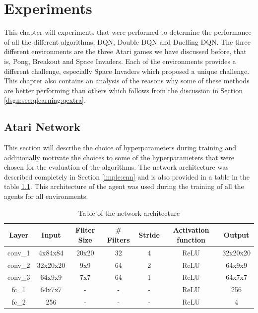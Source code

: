 \chapter{Experiments}
This chapter will experiments that were performed to determine the performance of all the different algorithms, DQN, Double DQN and Duelling DQN. The three different environments are the three Atari games we have discussed before, that is, Pong, Breakout and Space Invaders. Each of the environments provides a different challenge, especially Space Invaders which proposed a unique challenge. This chapter also contains an analysis of the reasons why some of these methods are better performing than others which follows from the discussion in Section \ref{dsgn:sec:qlearning:qextra}.

\section{Atari Network}
This section will describe the choice of hyperparameters during training and additionally motivate the choices to some of the hyperparameters that were chosen for the evaluation of the algorithms. The network architecture was described completely in Section \ref{imple:cnn} and is also provided in a table in the table \ref{table:network-arch}. This architecture of the agent was used during the training of all the agents for all environments.

\begin{table}[htbp]
  \centering
  \begin{tabular}{|c|c|c|c|c|c|c|}
    \hline
    Layer   & Input    & Filter Size & \# Filters & Stride & Activation function & Output   \\ \hline
    conv\_1 & 4x84x84  & 20x20       & 32         & 4      & ReLU                & 32x20x20 \\
    conv\_2 & 32x20x20 & 9x9         & 64         & 2      & ReLU                & 64x9x9   \\
    conv\_3 & 64x9x9   & 7x7         & 64         & 1      & ReLU                & 64x7x7   \\
    fc\_1   & 64x7x7   & -           & -          & -      & ReLU                & 256      \\
    fc\_2   & 256      & -           & -          & -      & ReLU                & 4        \\ \hline
  \end{tabular}
  \caption{Table of the network architecture
    \label{table:network-arch}
  }
\end{table}

